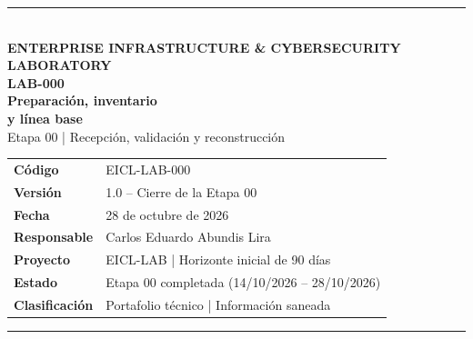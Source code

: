 \documentclass[11pt,a4paper]{article}
\renewcommand{\arraystretch}{1.25}
\begin{document}
\hypersetup{pageanchor=false}

\begin{titlepage}
  \thispagestyle{empty}
  \vspace*{2.0cm}
  {\color{accent}\rule{2cm}{5pt}}\\[1.0cm]
  {\sffamily\Large\bfseries\color{blue}
    ENTERPRISE INFRASTRUCTURE \& CYBERSECURITY}\\[0.08cm]
  {\sffamily\Large\bfseries\color{blue}
    LABORATORY}\\[0.55cm]
  {\sffamily\fontsize{29}{34}\selectfont\bfseries\color{navy}
    LAB-000\\ Preparación, inventario\\ y línea base}\\[0.7cm]
  {\Large\color{muted}Etapa 00 | Recepción, validación y reconstrucción}\\[1.5cm]

  \renewcommand{\arraystretch}{1.6}
  \begin{tabularx}{\textwidth}{>{\bfseries}p{3.4cm}X}
    Código & EICL-LAB-000 \\
    Versión & 1.0 -- Cierre de la Etapa 00 \\
    Fecha & 28 de octubre de 2026 \\
    Responsable & Carlos Eduardo Abundis Lira \\
    Proyecto & EICL-LAB | Horizonte inicial de 90 días \\
    Estado & Etapa 00 completada (14/10/2026 -- 28/10/2026) \\
    Clasificación & Portafolio técnico | Información saneada \\
  \end{tabularx}

  \vfill
  {\color{navy}\rule{\textwidth}{1pt}}\\[0.25cm]
\end{titlepage}
\hypersetup{pageanchor=true}

\tableofcontents
\clearpage

\end{document}
